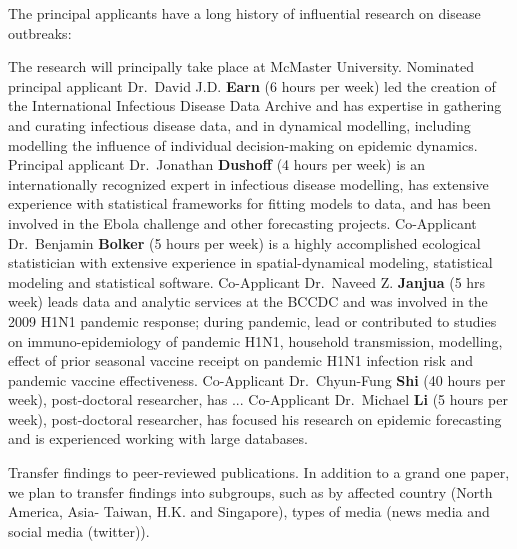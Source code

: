 
The principal applicants have a long history of influential research on disease outbreaks: 

The research will principally take place at McMaster University. 
Nominated principal applicant Dr.\ David J.D. \textbf{Earn} (6 hours per week) led the creation of the International Infectious Disease Data Archive and has expertise in gathering and curating infectious disease data, and in dynamical modelling, including modelling the influence of individual decision-making on epidemic dynamics.
Principal applicant Dr.\ Jonathan \textbf{Dushoff} (4 hours per week) is an internationally recognized expert in infectious disease modelling, has extensive experience with statistical frameworks for fitting models to data, and has been involved in the Ebola challenge and other forecasting projects. 
Co-Applicant Dr.\ Benjamin \textbf{Bolker} (5 hours per week) is a highly accomplished ecological statistician with extensive experience in spatial-dynamical modeling, statistical modeling and statistical software.
Co-Applicant Dr.\ Naveed Z. \textbf{Janjua} (5 hrs week) leads data and analytic services at the BCCDC and was involved in the 2009 H1N1 pandemic response; during pandemic, lead or contributed to studies on  immuno-epidemiology of pandemic H1N1, household transmission, modelling, effect of prior seasonal vaccine receipt on pandemic H1N1 infection risk and pandemic vaccine effectiveness. 
Co-Applicant Dr.\ Chyun-Fung \textbf{Shi} (40 hours per week), post-doctoral researcher, has ...
Co-Applicant Dr.\ Michael \textbf{Li} (5 hours per week), post-doctoral researcher, has focused his research on epidemic forecasting and is experienced working with large databases. 




Transfer findings to peer-reviewed publications.  
In addition to a grand one paper, we plan to transfer findings into subgroups, such as by affected country (North America, Asia- Taiwan, H.K. and Singapore), types of media (news media and social media (twitter)).

